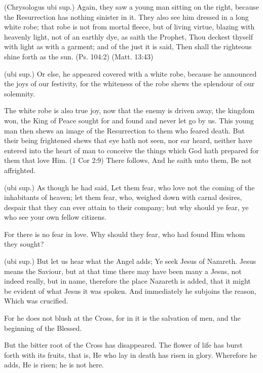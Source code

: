  (Chrysologus ubi sup.) Again, they saw a young man sitting on the right, because the Resurrection has nothing sinister in it. They also see him dressed in a long white robe; that robe is not from mortal fleece, but of living virtue, blazing with heavenly light, not of an earthly dye, as saith the Prophet, Thou deckest thyself with light as with a garment; and of the just it is said, Then shall the righteous shine forth as the sun. (Ps. 104:2) (Matt. 13:43)

 (ubi sup.) Or else, he appeared covered with a white robe, because he announced the joys of our festivity, for the whiteness of the robe shews the splendour of our solemnity.

 The white robe is also true joy, now that the enemy is driven away, the kingdom won, the King of Peace sought for and found and never let go by us. This young man then shews an image of the Resurrection to them who feared death. But their being frightened shews that eye hath not seen, nor ear heard, neither have entered into the heart of man to conceive the things which God hath prepared for them that love Him. (1 Cor 2:9) There follows, And he saith unto them, Be not affrighted.

 (ubi sup.) As though he had said, Let them fear, who love not the coming of the inhabitants of heaven; let them fear, who, weighed down with carnal desires, despair that they can ever attain to their company; but why should ye fear, ye who see your own fellow citizens.

 For there is no fear in love. Why should they fear, who had found Him whom they sought?

 (ubi sup.) But let us hear what the Angel adds; Ye seek Jesus of Nazareth. Jesus means the Saviour, but at that time there may have been many a Jesus, not indeed really, but in name, therefore the place Nazareth is added, that it might be evident of what Jesus it was spoken. And immediately he subjoins the reason, Which was crucified.

 For he does not blush at the Cross, for in it is the salvation of men, and the beginning of the Blessed.

 But the bitter root of the Cross has disappeared. The flower of life has burst forth with its fruits, that is, He who lay in death has risen in glory. Wherefore he adds, He is risen; he is not here.

